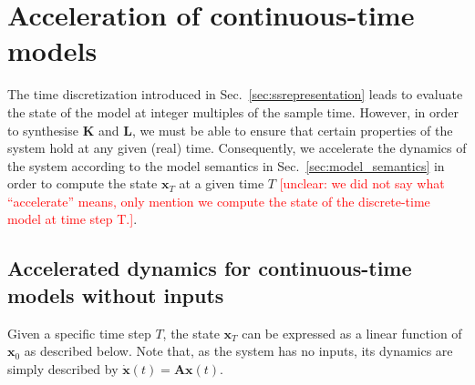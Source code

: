 \documentclass[sigconf]{llncs}
\newcommand{\mat}[1]{\boldsymbol{#1}}
\renewcommand{\vec}[1]{\boldsymbol{#1}}
\renewcommand{\note}[1]{\textcolor{red}{[#1]}}
\begin{document}
 \section{Acceleration of continuous-time models}\label{sec:continuous_time_accel}
 
The time discretization introduced in Sec.~\ref{sec:ssrepresentation} leads to evaluate the state of the model at integer multiples of the sample time. 
 However, in order to synthesise $\mat{K}$ and $\mat{L}$, 
 we must be able to ensure that certain properties of the system hold at any given (real) time. 
 Consequently, we accelerate the dynamics of the system according to the model semantics in Sec.~\ref{sec:model_semantics} in order to compute the state $\vec{x}_T$  at a given time $T$ \note{unclear: we did not say what ``accelerate'' means, only mention we compute the state of the discrete-time model at time step T.}.
 
 
 \subsection{Accelerated dynamics for continuous-time models without inputs}\label{sec:real_discrete_no_inputs}

 Given a specific time step $T$, 
 the state $\vec{x}_T$ can be expressed as a linear function of $\vec{x}_0$ as described below. 
 Note that, as the system has no inputs, its dynamics are simply described by $\dot{\vec{x}}(t)=\mat{A}\vec{x}(t)$.
 
\end{document}
